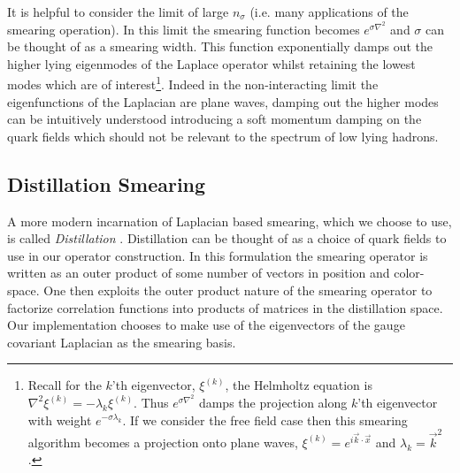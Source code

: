 It is helpful to consider the limit of large $n_\sigma$ (i.e. many applications of the smearing operation). In this limit the smearing function becomes $e^{\sigma \nabla^2}$ and $\sigma$ can be thought of as a smearing width. This function exponentially damps out the higher lying eigenmodes of the Laplace operator whilst retaining the lowest modes which are of interest\footnote{Recall for the $k$'th eigenvector, $\xi^{(k)}$, the Helmholtz equation is $\nabla^2\xi^{(k)} = - \lambda_k \xi^{(k)}$. Thus $e^{\sigma \nabla^2}$ damps the projection along $k$'th eigenvector with weight $e^{-\sigma \lambda_k}$. If we consider the free field case then this smearing algorithm becomes a projection onto plane waves, $\xi^{(k)} = e^{i\vec{k}\cdot \vec{x}}$ and $\lambda_k = \vec{k}^2$.  }. Indeed in the non-interacting limit the eigenfunctions of the Laplacian are plane waves, damping out the higher modes can be intuitively understood introducing a soft momentum damping on the quark fields which should not be relevant to the spectrum of low lying hadrons. 




\subsection{Distillation Smearing} \label{sec::Spec:ops:Distsmear}

A more modern incarnation of Laplacian based smearing, which we choose to use, is called \emph{Distillation} \cite{Peardon:2009gh}. Distillation can be thought of as a choice of quark fields to use in our operator construction. In this formulation the smearing operator is written as an outer product of some number of vectors in position and color-space. One then exploits the outer product nature of the smearing operator to factorize correlation functions into products of matrices in the distillation space. Our implementation chooses to make use of the eigenvectors of the gauge covariant Laplacian as the smearing basis. 

 
